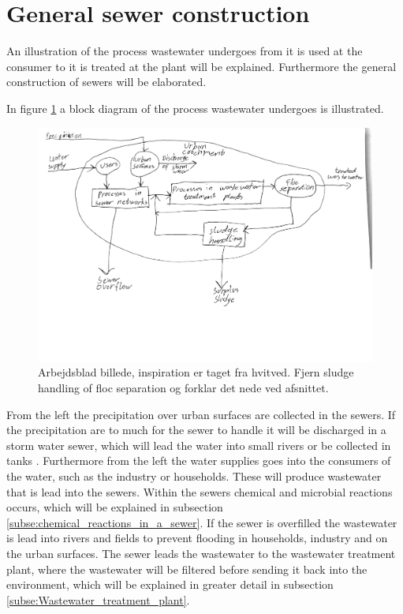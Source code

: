 \section{General sewer construction}\label{se:sewer_construction}
An illustration of the process wastewater undergoes from it is used at the consumer to it is treated at the plant will be explained. Furthermore the general construction of sewers will be elaborated.    

In figure \ref{fig:sewer_overview_of_the_different_parts} a block diagram of the process wastewater undergoes is illustrated.
\begin{figure}[H]
\centering
\includegraphics[width=1\textwidth]{report/introduction/pictures/sewer_process2.pdf}
\caption{Arbejdsblad billede, inspiration er taget fra hvitved. Fjern sludge handling of floc separation og forklar det nede ved afsnittet.}
\label{fig:sewer_overview_of_the_different_parts}
\end{figure}
From the left the precipitation over urban surfaces are collected in the sewers. If the precipitation are to much for the sewer to handle it will be discharged in a storm water sewer, which will lead the water into small rivers or be collected in tanks . Furthermore from the left the water supplies goes into the consumers of the water, such as the industry or households. These will produce wastewater that is lead into the sewers. Within the sewers chemical and microbial reactions occurs, which will be explained in subsection \ref{subse:chemical_reactions_in_a_sewer}. If the sewer is overfilled the wastewater is lead into rivers and fields to prevent flooding in households, industry and on the urban surfaces. The sewer leads the wastewater to the wastewater treatment plant, where the wastewater will be filtered before sending it back into the environment, which will be explained in greater detail in subsection \ref{subse:Wastewater_treatment_plant}. 

